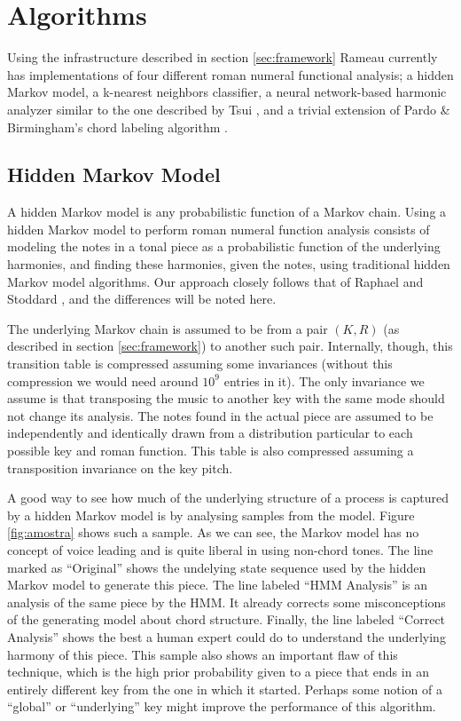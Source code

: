 \section{Algorithms}
\label{sec:algorithms}

Using the infrastructure described in section \ref{sec:framework}
Rameau currently has implementations of four different roman numeral
functional analysis; a hidden Markov model, a k-nearest neighbors
classifier, a neural network-based harmonic analyzer similar to the
one described by Tsui \cite{tsui02:harmonic}, and a trivial extension
of Pardo \& Birmingham's chord labeling algorithm
\cite{pardo.ea99:automated}.

\subsection{Hidden Markov Model}
\label{sec:hidden-markov-model}

A hidden Markov model is any probabilistic function of a Markov
chain. Using a hidden Markov model to perform roman numeral function
analysis consists of modeling the notes in a tonal piece as a
probabilistic function of the underlying harmonies, and finding these
harmonies, given the notes, using traditional hidden Markov model
algorithms. Our approach closely follows that of Raphael and Stoddard
\cite{raphael.ea03:harmonic}, and the differences will be noted here.

The underlying Markov chain is assumed to be from a pair $(K,R)$ (as
described in section \ref{sec:framework}) to another such
pair. Internally, though, this transition table is compressed assuming
some invariances (without this compression we would need around $10^9$
entries in it). The only invariance we assume is that transposing the
music to another key with the same mode should not change its
analysis. The notes found in the actual piece are assumed to be
independently and identically drawn from a distribution particular to
each possible key and roman function. This table is also compressed
assuming a transposition invariance on the key pitch. 

A good way to see how much of the underlying structure of a process is
captured by a hidden Markov model is by analysing samples from the
model. Figure \ref{fig:amostra} shows such a sample. As we can see,
the Markov model has no concept of voice leading and is quite liberal
in using non-chord tones. The line marked as ``Original'' shows the
undelying state sequence used by the hidden Markov model to generate
this piece. The line labeled ``HMM Analysis'' is an analysis of the
same piece by the HMM. It already corrects some misconceptions of the
generating model about chord structure. Finally, the line labeled
``Correct Analysis'' shows the best a human expert could do to
understand the underlying harmony of this piece. This sample also
shows an important flaw of this technique, which is the high prior
probability given to a piece that ends in an entirely different key
from the one in which it started. Perhaps some notion of a ``global''
or ``underlying'' key might improve the performance of this algorithm.

